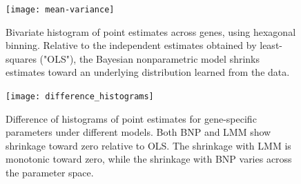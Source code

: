 {\begin{figure}[ht]
\centering
\texttt{[image: mean-variance]}
\caption{\small Bivariate histogram of point estimates across genes, using hexagonal binning. Relative to the independent estimates obtained by least-squares ("OLS"), the Bayesian nonparametric model shrinks estimates toward an underlying distribution learned from the data.}
\label{mean-variance}
\end{figure}

\begin{figure}[ht]
\centering
\texttt{[image: difference\_histograms]}
\caption{\small Difference of histograms of point estimates for gene-specific parameters under different models. Both BNP and LMM show shrinkage toward zero relative to OLS. The shrinkage with LMM is monotonic toward zero, while the shrinkage with BNP varies across the parameter space.}
\label{diff-hist}
\end{figure}


}
